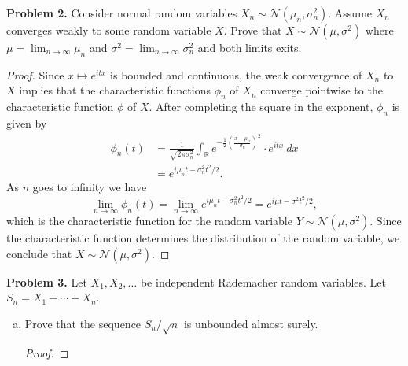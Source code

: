 \documentclass[11pt,letterpaper]{report}
\newcommand{\reals}{\mathbb{R}}
\newcommand{\mcal}[1]{\mathcal{#1}}
\begin{document}
\noindent\textbf{Problem 2. }
Consider normal random variables $X_n\sim \mcal{N}(\mu_n, \sigma^2_n)$. Assume $X_n$ converges weakly to some random variable $X$. Prove that $X\sim \mcal{N}(\mu, \sigma^2)$ where $\mu = \lim_{n\to \infty}\mu_n$ and $\sigma^2 = \lim_{n\to \infty}\sigma_n^2$ and both limits exits.
\begin{proof}
	Since $x\mapsto e^{itx}$ is bounded and continuous, the weak convergence of $X_n$ to $X$ implies that the characteristic functions $\phi_n$ of $X_n$ converge pointwise to the characteristic function $\phi$ of $X$. After completing the square in the exponent, $\phi_n$ is given by
	\begin{align*}
		\phi_n(t) &= \frac{1}{\sqrt{2\pi \sigma_n^2}}\int_\reals e^{-\frac{1}{2}\left(\frac{x-\mu_n}{\sigma_n}\right)^2}\cdot e^{itx}\ dx\\
		&= e^{i\mu_nt - \sigma_n^2t^2/2}.
	\end{align*}
	As $n$ goes to infinity we have
	\[
	\lim_{n\to \infty}\phi_n(t) = \lim_{n\to \infty}e^{i\mu_nt - \sigma_n^2t^2/2} = e^{i\mu t- \sigma^2t^2/2},
	\]
	which is the characteristic function for the random variable $Y\sim \mcal{N}(\mu, \sigma^2)$. Since the characteristic function determines the distribution of the random variable, we conclude that $X\sim \mcal{N}(\mu, \sigma^2)$.
\end{proof}

\noindent\textbf{Problem 3. }
Let $X_1, X_2, \ldots$ be independent Rademacher random variables. Let $S_n = X_1 + \cdots + X_n$.
\begin{enumerate}[(a)]
	\item Prove that the sequence $S_n/\sqrt{n}$ is unbounded almost surely.
	\begin{proof}
		
	\end{proof}
\end{enumerate}
\end{document}
